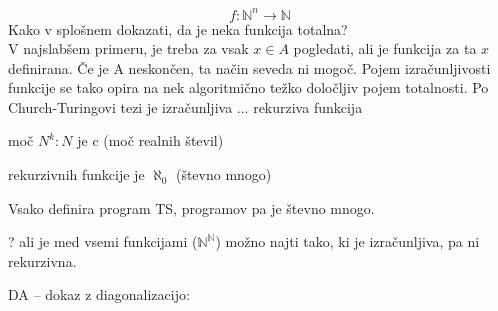 \documentclass[10pt,a4paper,oneside]{book}
\begin{document}
\[ f:\mathbb{N}^n\rightarrow\mathbb{N} \]
Kako v splošnem dokazati, da je neka funkcija totalna?\\
V najslabšem primeru, je treba za vsak $x\in A$ pogledati, ali je funkcija za ta $x$ definirana. %
Če je A neskončen, ta način seveda ni mogoč.
Pojem izračunljivosti funkcije se tako opira na nek algoritmično težko določljiv pojem totalnosti.
\br
Po Church-Turingovi tezi je izračunljiva ... rekurziva funkcija %
\begin{items}
\item moč $N^k:N$ je c (moč realnih števil)%
\item rekurzivnih funkcije je $\aleph_0$ (števno mnogo)
\item Vsako definira program TS, programov pa je števno mnogo.
\item ? ali je med vsemi funkcijami ($\mathbb{N}^\mathbb{N}$) možno najti tako, ki je izračunljiva, pa ni rekurzivna.
\item DA -- dokaz z diagonalizacijo:\\
\end{items}
\end{document}

